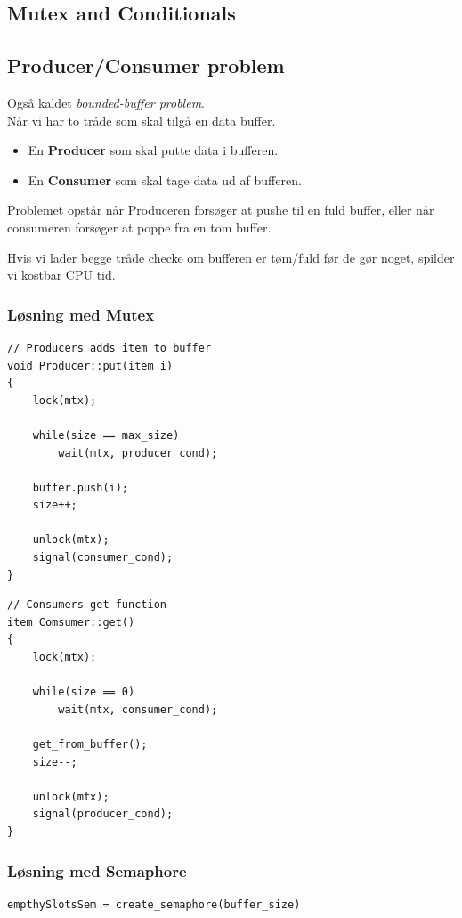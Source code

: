 \subsection{Mutex and Conditionals}

\subsection{Producer/Consumer problem}
Også kaldet \textit{bounded-buffer problem}.\\

Når vi har to tråde som skal tilgå en data buffer.

\begin{itemize}
	\item En \textbf{Producer} som skal putte data i bufferen.
	\item En \textbf{Consumer} som skal tage data ud af bufferen.
\end{itemize}

Problemet opstår når Produceren forsøger at pushe til en fuld buffer, eller når consumeren forsøger at poppe fra en tom buffer.

Hvis vi lader begge tråde checke om bufferen er tøm/fuld før de gør noget, spilder vi kostbar CPU tid.

\subsubsection{Løsning med Mutex}

\begin{lstlisting}[otherkeywords={item, buffer, unlock, lock, signal}]
// Producers adds item to buffer
void Producer::put(item i)
{
	lock(mtx);
	
	while(size == max_size)
		wait(mtx, producer_cond);
		
	buffer.push(i);
	size++;
	
	unlock(mtx);
	signal(consumer_cond);
}
\end{lstlisting}

\begin{lstlisting}
// Consumers get function
item Comsumer::get()
{
	lock(mtx);
	
	while(size == 0)
		wait(mtx, consumer_cond);
		
	get_from_buffer();
	size--;
	
	unlock(mtx);
	signal(producer_cond);
}
\end{lstlisting}

\subsubsection{Løsning med Semaphore}
\begin{lstlisting}[otherkeywords={}]
empthySlotsSem = create_semaphore(buffer_size)
\end{lstlisting}

